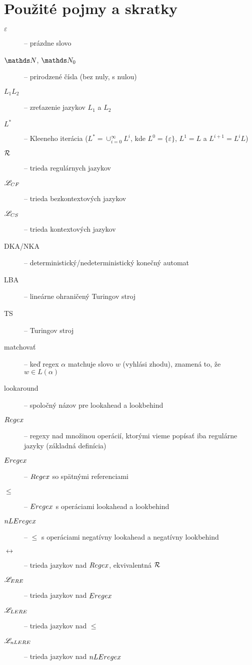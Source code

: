 \chapter*{Použité pojmy a skratky}
\label{chap:pojmy}
{}

\begin{description}
\item[$\varepsilon$] -- prázdne slovo
\item[$\N$, $\N_0$] -- prirodzené čísla (bez nuly, s nulou)
\item[$ L_{1}L_{2} $] -- zreťazenie jazykov $ L_{1} $ a $ L_{2} $
\item[$ L^* $] -- Kleeneho iterácia ($L^*=\cup^{\infty}_{i=0}L^i$, kde $L^0=\lbrace \varepsilon \rbrace$, $L^1=L$ a $L^{i+1}=L^iL$)
\item[$ {\cal R} $] -- trieda regulárnych jazykov
\item[$ \mathscr{L}_{CF}$] -- trieda bezkontextových jazykov
\item[$ \mathscr{L}_{CS}$] -- trieda kontextových jazykov
\item[DKA/NKA] -- deterministický/nedeterministický konečný automat
\item[LBA] -- lineárne ohraničený Turingov stroj
\item[TS] -- Turingov stroj
\item[matchovať] -- keď regex $\alpha$ matchuje slovo $w$ (vyhlási zhodu), znamená to, že $w\in L(\alpha)$
\item[lookaround] -- spoločný názov pre lookahead a lookbehind

\item[$Regex$] -- regexy nad množinou operácií, ktorými vieme popísať iba regulárne jazyky (základná definícia)
\item[$Eregex$] -- $Regex$ so spätnými referenciami
\item[$\le$] -- $Eregex$ s operáciami lookahead a lookbehind
\item[$nLEregex$] -- $\le$ s operáciami negatívny lookahead a negatívny lookbehind
\item[$\rel$] -- trieda jazykov nad $Regex$, ekvivalentná ${\cal R}$
\item[$\mathscr{L}_{ERE}$] -- trieda jazykov nad $Eregex$
\item[$\mathscr{L}_{LERE}$] -- trieda jazykov nad $\le$
\item[$\mathscr{L}_{nLERE}$] -- trieda jazykov nad $nLEregex$
\end{description}